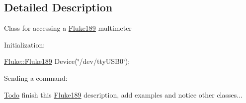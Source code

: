 \subsection{Detailed Description}
Class for accessing a \hyperlink{classFluke_1_1Fluke189}{Fluke189} multimeter\par


Initialization:\par
 \hyperlink{classFluke_1_1Fluke189}{Fluke::Fluke189} Device(\char`\"{}/dev/ttyUSB0\char`\"{});\par


Sending a command:\par
 \begin{Desc}
\item[\hyperlink{todo__todo000002}{Todo}]finish this \hyperlink{classFluke_1_1Fluke189}{Fluke189} description, add examples and notice other classes...\end{Desc}


